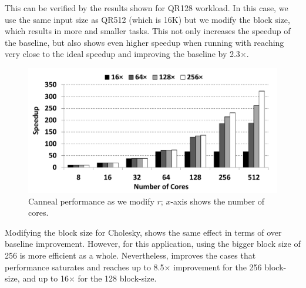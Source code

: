 This can be verified by the results shown for QR128 workload.
In this case, we use the same input size as QR512 (which is 16K) but we modify the block size, which results in more and smaller tasks.
This not only increases the speedup of the baseline, but also shows even higher speedup when running with {\proposal} reaching very close to the ideal speedup and improving the baseline by 2.3$\times$.
\begin{figure}[t]
	\centering
	\includegraphics[width=0.75\columnwidth]{figures/canneal_perf.pdf}
	\caption{Canneal performance as we modify $r$; $x$-axis shows the number of cores.}
	\label{fig:canneal}
\end{figure}
Modifying the block size for Cholesky, shows the same effect in terms of {\proposal} over baseline improvement.
However, for this application, using the bigger block size of 256 is more efficient as a whole.
Nevertheless, {\proposal} improves the cases that performance saturates and reaches up to 8.5$\times$ improvement for the 256 block-size, and up to 16$\times$ for the 128 block-size.


